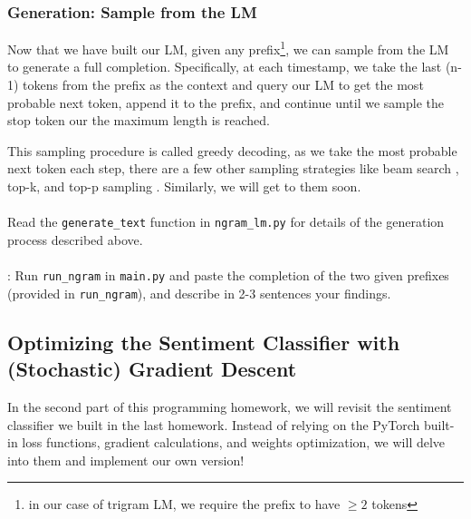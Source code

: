 \subsubsection{Generation: Sample from the LM}
Now that we have built our LM, given any prefix\footnote{in our case of trigram LM, we require the prefix to have $\geq2$ tokens}, we can sample from the LM to generate a full completion. Specifically, at each timestamp, we take the last (n-1) tokens from the prefix as the context and query our LM to get the most probable next token, append it to the prefix, and continue until we sample the stop token our the maximum length is reached. 

This sampling procedure is called greedy decoding, as we take the most probable next token each step, there are a few other sampling strategies like beam search \citep{meisteretal2020beam}, top-k, and top-p sampling \citep{holtzman2019curious}. Similarly, we will get to them soon.
\\\\
\noindent Read the \texttt{generate\_text} function in \texttt{ngram\_lm.py} for details of the generation process described above.
\\\\
\noindent \todo{}: Run \texttt{run\_ngram} in \texttt{main.py} and paste the completion of the two given prefixes (provided in \texttt{run\_ngram}), and describe in 2-3 sentences your findings.
\\

\subsection{Optimizing the Sentiment Classifier with (Stochastic) Gradient Descent}
In the second part of this programming homework, we will revisit the sentiment classifier we built in the last homework. Instead of relying on the PyTorch built-in loss functions, gradient calculations, and weights optimization, we will delve into them and implement our own version!

